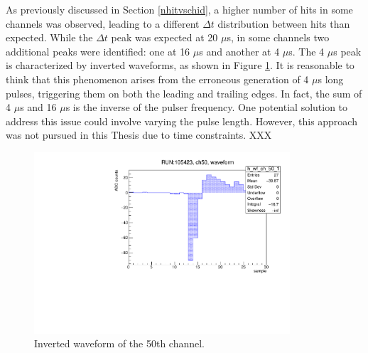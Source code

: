 As previously discussed in Section \ref{nhitvschid}, a higher number of hits in some channels was observed, 
leading to a different $\Delta t$ distribution between hits than expected. 
While the $\Delta t$ peak was expected at 20 $\mu$s, in some channels two additional peaks were identified: 
one at 16 $\mu$s and another at 4 $\mu$s. The 4 $\mu$s peak is characterized by inverted waveforms, as shown in Figure \ref{fig:inverted}. 
It is reasonable to think that this phenomenon arises from the erroneous generation of 4 $\mu$s long pulses, 
triggering them on both the leading and trailing edges. In fact, the sum of 4 $\mu$s and 16 $\mu$s is the inverse of the pulser frequency. 
One potential solution to address this issue could involve varying the pulse length. 
However, this approach was not pursued in this Thesis due to time constraints.
XXX
\begin{figure}[!h]
  \centering
  \includegraphics[width=0.85\textwidth]{figures/pdf/wf_ch50_1.pdf}
  \caption{Inverted waveform of the 50th channel.}
 \label{fig:inverted}
\end{figure}
